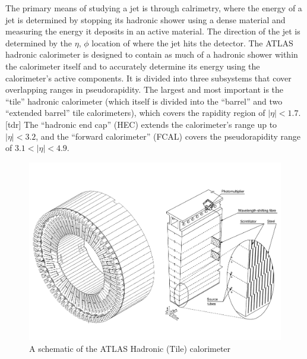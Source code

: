 The primary means of studying a jet is through calrimetry, where the energy of a jet is determined by stopping its hadronic shower using a dense material and measuring the energy it deposits in an active material.
The direction of the jet is determined by the  $\eta$, $\phi$ location of where the jet hits the detector.
The ATLAS hadronic calorimeter is designed to contain as much of a hadronic shower within the calorimeter itself and to accurately determine its energy using the calorimeter's active components.
It is divided into three subsystems that cover overlapping ranges in pseudorapidity.
The largest and most important is the ``tile'' hadronic calorimeter (which itself is divided into the ``barrel'' and two ``extended barrel'' tile calorimeters), which covers the rapidity region of $|\eta| < 1.7$. [tdr]  
The ``hadronic end cap'' (HEC) extends the calorimeter's range up to $|\eta| < 3.2$, and the ``forward calorimeter'' (FCAL) covers the pseudorapidity range of $3.1 < |\eta| < 4.9$.  

\begin{figure}
  \begin{center}
    \includegraphics[width=125mm]{figures/atlas/TileCalorimeter.pdf}
  \end{center}
  \caption{A schematic of the ATLAS Hadronic (Tile) calorimeter}
  \label{img:HadronicCalorimeter}
\end{figure}





